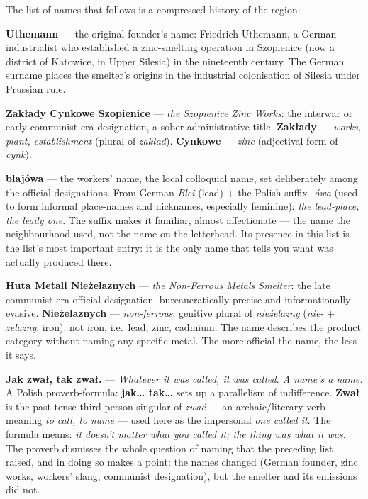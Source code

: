 \medskip
The list of names that follows is a compressed history
of the region:

\textbf{Uthemann} --- the original founder's name:
Friedrich Uthemann, a German industrialist who
established a zinc-smelting operation in Szopienice
(now a district of Katowice, in Upper Silesia) in
the nineteenth century. The German surname places the
smelter's origins in the industrial colonisation of
Silesia under Prussian rule.

\textbf{Zakłady Cynkowe Szopienice} --- \textit{the
Szopienice Zinc Works}: the interwar or early
communist-era designation, a sober administrative
title. \textbf{Zakłady} --- \textit{works, plant,
establishment} (plural of \textit{zakład}).
\textbf{Cynkowe} --- \textit{zinc} (adjectival form
of \textit{cynk}).

\textbf{blajówa} --- the workers' name, the local
colloquial name, set deliberately among the official
designations. From German \textit{Blei} (lead) +
the Polish suffix \textit{-ówa} (used to form
informal place-names and nicknames, especially
feminine): \textit{the lead-place, the leady one}.
The suffix makes it familiar, almost affectionate ---
the name the neighbourhood used, not the name on
the letterhead. Its presence in this list is the
list's most important entry: it is the only name
that tells you what was actually produced there.

\textbf{Huta Metali Nieżelaznych} --- \textit{the
Non-Ferrous Metals Smelter}: the late communist-era
official designation, bureaucratically precise and
informationally evasive. \textbf{Nieżelaznych} ---
\textit{non-ferrous}: genitive plural of
\textit{nieżelazny} (\textit{nie-} + \textit{żelazny},
iron): not iron, i.e.\ lead, zinc, cadmium. The
name describes the product category without naming
any specific metal. The more official the name, the
less it says.

\textbf{Jak zwał, tak zwał.} --- \textit{Whatever
it was called, it was called. A name's a name.}
A Polish proverb-formula: \textbf{jak\ldots{}
tak\ldots{}} sets up a parallelism of indifference.
\textbf{Zwał} is the past tense third person
singular of \textit{zwać} --- an archaic/literary
verb meaning \textit{to call, to name} --- used
here as the impersonal \textit{one called it}.
The formula means: \textit{it doesn't matter what
you called it; the thing was what it was}. The
proverb dismisses the whole question of naming
that the preceding list raised, and in doing so
makes a point: the names changed (German founder,
zinc works, workers' slang, communist designation),
but the smelter and its emissions did not.

